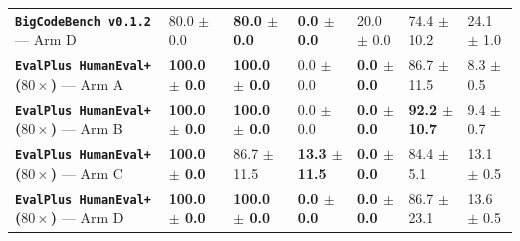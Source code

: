 \documentclass[11pt,a4paper,copyright]{google}
\begin{document}
\begin{table}[t!]
\begin{tabularx}{\textwidth}{Y C{1.85cm} C{1.95cm} C{1.85cm} C{1.65cm} C{1.85cm} C{1.45cm}}
\textbf{\texttt{BigCodeBench v0.1.2}} --- Arm D & 80.0 $\pm$ 0.0 & \textcolor{evalPass}{\textbf{80.0 $\pm$ 0.0}} & \textcolor{evalPass}{\textbf{0.0 $\pm$ 0.0}} & 20.0 $\pm$ 0.0 & 74.4 $\pm$ 10.2 & 24.1 $\pm$ 1.0 \\
\addlinespace[2pt]
\textbf{\texttt{EvalPlus HumanEval+} ($80\times$)} --- Arm A & \textbf{100.0 $\pm$ 0.0} & \textbf{100.0 $\pm$ 0.0} & 0.0 $\pm$ 0.0 & \textbf{0.0 $\pm$ 0.0} & 86.7 $\pm$ 11.5 & 8.3 $\pm$ 0.5 \\
\textbf{\texttt{EvalPlus HumanEval+} ($80\times$)} --- Arm B & \textbf{100.0 $\pm$ 0.0} & \textbf{100.0 $\pm$ 0.0} & 0.0 $\pm$ 0.0 & \textbf{0.0 $\pm$ 0.0} & \textbf{92.2 $\pm$ 10.7} & 9.4 $\pm$ 0.7 \\
\textbf{\texttt{EvalPlus HumanEval+} ($80\times$)} --- Arm C & \textbf{100.0 $\pm$ 0.0} & 86.7 $\pm$ 11.5 & \textcolor{evalFail}{\textbf{13.3 $\pm$ 11.5}} & \textbf{0.0 $\pm$ 0.0} & 84.4 $\pm$ 5.1 & 13.1 $\pm$ 0.5 \\
\textbf{\texttt{EvalPlus HumanEval+} ($80\times$)} --- Arm D & \textbf{100.0 $\pm$ 0.0} & \textcolor{evalPass}{\textbf{100.0 $\pm$ 0.0}} & \textcolor{evalPass}{\textbf{0.0 $\pm$ 0.0}} & \textbf{0.0 $\pm$ 0.0} & 86.7 $\pm$ 23.1 & 13.6 $\pm$ 0.5 \\
\bottomrule
\end{tabularx}
\end{table}
\end{document}
